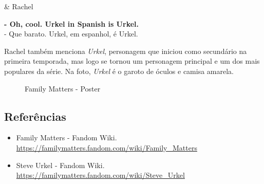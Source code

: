 \begin{tcolorbox}[enhanced,center upper,
    drop fuzzy shadow southeast, boxrule=0.3pt,
    lower separated=false, breakable,
    colframe=black!30!dialogoBorder,colback=white]
\begin{minipage}[c]{0.16\linewidth}
   & \centering \scriptsize{Rachel}
\end{minipage}
\hfill
\begin{minipage}[c]{0.8\linewidth}
  \textbf{- Oh, cool. Urkel in Spanish is Urkel.}\\
  - Que barato. Urkel, em espanhol, é Urkel.
\end{minipage}
\end{tcolorbox}

Rachel também menciona \emph{Urkel}, personagem que iniciou como
secundário na primeira temporada, mas logo se tornou um personagem
principal e um dos mais populares da série. Na foto, \emph{Urkel} é o
garoto de óculos e camisa amarela.

\begin{figure}
  \centering
    \caption{Family Matters - Poster\label{fig:family-matters-poster}}
\end{figure}

\hypertarget{referuxeancias-2}{%
\subsection{Referências}\label{referuxeancias-2}}

\begin{itemize}
\tightlist
\item
  \sloppy Family Matters - Fandom Wiki. \url{https://familymatters.fandom.com/wiki/Family_Matters}
\item
  \sloppy Steve Urkel - Fandom Wiki. \url{https://familymatters.fandom.com/wiki/Steve_Urkel}
\end{itemize}

